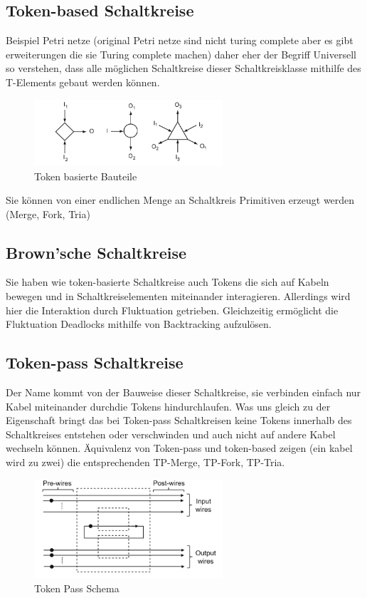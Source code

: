 \subsection{Token-based Schaltkreise}
Beispiel Petri netze (original Petri netze sind nicht turing complete aber 
es gibt erweiterungen die sie Turing complete machen) daher eher 
der Begriff Universell so verstehen, dass alle möglichen Schaltkreise
dieser Schaltkreisklasse mithilfe des T-Elements gebaut werden können.
%

\begin{figure}[h]
    \includegraphics[width=7cm]{bilder/tokenBased.png}
    \caption{Token basierte Bauteile}
\end{figure}    

%
Sie können von einer endlichen Menge an Schaltkreis Primitiven 
erzeugt werden (Merge, Fork, Tria)


\subsection{Brown'sche Schaltkreise}
Sie haben wie token-basierte Schaltkreise auch Tokens die sich auf Kabeln bewegen
und in Schaltkreiselementen miteinander interagieren.
%
Allerdings wird hier die Interaktion durch Fluktuation getrieben. 
%
Gleichzeitig ermöglicht die Fluktuation Deadlocks mithilfe 
von Backtracking aufzulösen.


\subsection{Token-pass Schaltkreise}
Der Name kommt von der Bauweise dieser Schaltkreise, sie verbinden einfach nur Kabel 
miteinander durchdie Tokens hindurchlaufen.
%
Was uns gleich zu der Eigenschaft
bringt das bei Token-pass Schaltkreisen keine Tokens innerhalb des Schaltkreises 
entstehen oder verschwinden und auch nicht auf andere Kabel wechseln können.
%
Äquivalenz von Token-pass und token-based zeigen (ein kabel wird zu zwei)
die entsprechenden TP-Merge, TP-Fork, TP-Tria.
%
\begin{figure}[h]
  \begin{minipage}{0.45\textwidth}
    \centering
    \includegraphics[width=7cm]{bilder/TokenPassScheme.png}
    \caption{Token Pass Schema}
  \end{minipage}\hfill   
\end{figure} 

